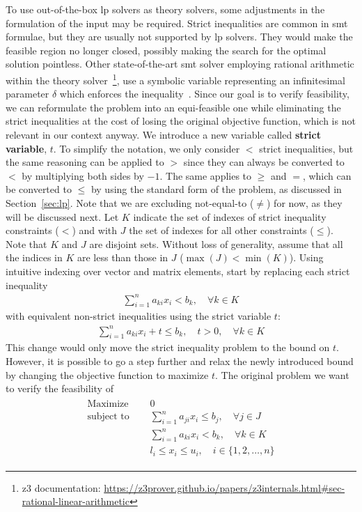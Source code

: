\documentclass[runningheads]{llncs}
\begin{document}
To use out-of-the-box \gls{lp} solvers as theory solvers, some adjustments in the formulation of the input may be required.
Strict inequalities are common in \gls{smt} formulae, but they are usually not supported by \gls{lp} solvers.
They would make the feasible region no longer closed, possibly making the search for the optimal solution pointless.
Other state-of-the-art \gls{smt} solver employing rational arithmetic within the theory solver~\footnote{z3 documentation: \url{https://z3prover.github.io/papers/z3internals.html\#sec-rational-linear-arithmetic}}, use a symbolic variable representing an infinitesimal parameter $\delta$ which enforces the inequality~\cite{ref:lra-dpll-t}.
Since our goal is to verify feasibility, we can reformulate the problem into an equi-feasible one while eliminating the strict inequalities at the cost of losing the original objective function, which is not relevant in our context anyway.
We introduce a new variable called \textbf{strict variable}, $t$.
To simplify the notation, we only consider $<$ strict inequalities, but the same reasoning can be applied to $>$ since they can always be converted to $<$ by multiplying both sides by $-1$.
The same applies to $\ge$ and $=$, which can be converted to $\le$ by using the standard form of the problem, as discussed in Section~\ref{sec:lp}.
Note that we are excluding not-equal-to ($\neq$) for now, as they will be discussed next.
Let $K$ indicate the set of indexes of strict inequality constraints ($<$) and with $J$ the set of indexes for all other constraints ($\le$).
Note that $K$ and $J$ are disjoint sets.
Without loss of generality, assume that all the indices in $K$ are less than those in $J$ ($\max(J) < \min(K)$).
Using intuitive indexing over vector and matrix elements, start by replacing each strict inequality
\begin{align*}
    \sum_{i=1}^{n} a_{ki}x_{i} < b_k, \quad \forall k \in K
\end{align*}
with equivalent non-strict inequalities using the strict variable $t$:
\begin{align*}
    \sum_{i=1}^{n} a_{ki}x_{i} + t \le b_k, \quad t > 0, \quad \forall k \in K
\end{align*}
This change would only move the strict inequality problem to the bound on $t$.
However, it is possible to go a step further and relax the newly introduced bound by changing the objective function to maximize $t$.
The original problem we want to verify the feasibility of
\begin{align}
    \label{eq:lp-original}
    \begin{split}
        \text{Maximize }   \quad & 0                                                          \\
        \text{subject to } \quad & \sum_{i=1}^{n} a_{ji}x_{i} \le b_j,  \quad \forall j \in J \\
        \quad                    & \sum_{i=1}^{n} a_{ki}x_{i} < b_k,   \quad \forall k \in K  \\
        & l_i \le x_i \le u_i,  \quad i \in \{1, 2, \ldots, n\}
    \end{split}
\end{align}
\end{document}
